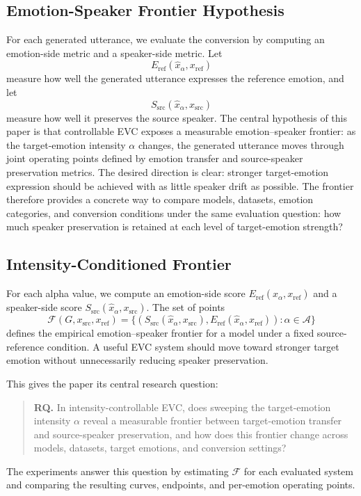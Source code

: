 \subsection{Emotion-Speaker Frontier Hypothesis}
For each generated utterance, we evaluate the conversion by computing an emotion-side metric and a speaker-side metric.
Let
\begin{equation}
E_{\mathrm{ref}}(\hat{x}_{\alpha},x_{\mathrm{ref}})
\end{equation}
measure how well the generated utterance expresses the reference emotion, and let
\begin{equation}
S_{\mathrm{src}}(\hat{x}_{\alpha},x_{\mathrm{src}})
\end{equation}
measure how well it preserves the source speaker.
The central hypothesis of this paper is that controllable EVC exposes a measurable emotion--speaker frontier: as the target-emotion intensity $\alpha$ changes, the generated utterance moves through joint operating points defined by emotion transfer and source-speaker preservation metrics.
The desired direction is clear: stronger target-emotion expression should be achieved with as little speaker drift as possible.
The frontier therefore provides a concrete way to compare models, datasets, emotion categories, and conversion conditions under the same evaluation question: how much speaker preservation is retained at each level of target-emotion strength?


\subsection{Intensity-Conditioned Frontier}
For each alpha value, we compute an emotion-side score $E_{\mathrm{ref}}(\hat{x}_{\alpha},x_{\mathrm{ref}})$ and a speaker-side score $S_{\mathrm{src}}(\hat{x}_{\alpha},x_{\mathrm{src}})$.
The set of points
\begin{equation}
\mathcal{F}(G,x_{\mathrm{src}},x_{\mathrm{ref}})
=
\{(S_{\mathrm{src}}(\hat{x}_{\alpha},x_{\mathrm{src}}),
E_{\mathrm{ref}}(\hat{x}_{\alpha},x_{\mathrm{ref}})) :
\alpha \in \mathcal{A}\}
\end{equation}
defines the empirical emotion--speaker frontier for a model under a fixed source-reference condition.
A useful EVC system should move toward stronger target emotion without unnecessarily reducing speaker preservation.

This gives the paper its central research question:
\begin{quote}
\textbf{RQ.} In intensity-controllable EVC, does sweeping the target-emotion intensity $\alpha$ reveal a measurable frontier between target-emotion transfer and source-speaker preservation, and how does this frontier change across models, datasets, target emotions, and conversion settings?
\end{quote}
The experiments answer this question by estimating $\mathcal{F}$ for each evaluated system and comparing the resulting curves, endpoints, and per-emotion operating points.

